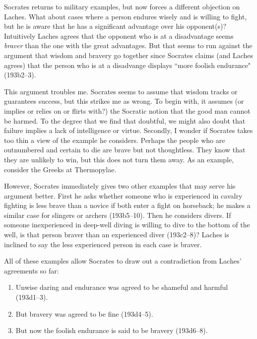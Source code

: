 \documentclass[11pt]{article}
\begin{document}
Socrates returns to military examples, but now forces a different objection on
Laches.  What about cases where a person endures wisely and is willing to
fight, but he is aware that he has a significant advantage over his
opponent(s)?  Intuitively Laches agrees that the opponent who is at
a disadvantage seems \emph{braver} than the one with the great advantages.  But
that seems to run against the argument that wisdom and bravery go together
since Socrates claims (and Laches agrees) that the person who is at
a disadvange displays ``more foolish endurance" (193b2--3).

This argument troubles me.  Socrates seems to assume that wisdom tracks or
guarantees success, but this strikes me as wrong.  To begin with, it assumes
(or implies or relies on or flirts with?) the Socratic notion that the good man
cannot be harmed.  To the degree that we find that doubtful, we might also
doubt that failure implies a lack of intelligence or virtue.  Secondly,
I wonder if Socrates takes too thin a view of the example he considers.
Perhaps the people who are outnumbered and certain to die are brave but not
thoughtless.  They know that they are unlikely to win, but this does not turn
them away.  As an example, consider the Greeks at Thermopylae.

However, Socrates immediately gives two other examples that may serve his
argument better.  First he asks whether someone who is experienced in cavalry
fighting is less brave than a novice if both enter a fight on horseback; he
makes a similar case for slingers or archers (193b5--10).  Then he considers
divers.  If someone inexperienced in deep-well diving is willing to dive to the
bottom of the well, is that person braver than an experienced diver (193c2--8)?
Laches is inclined to say the less experienced person in each case is braver.

All of these examples allow Socrates to draw out a contradiction from Laches'
agreements so far:

\begin{enumerate}

    \item Unwise daring and endurance was agreed to be shameful and harmful
        (193d1--3).

    \item But bravery was agreed to be fine (193d4--5).

    \item But now the foolish endurance is said to be bravery (193d6--8).

\end{enumerate}
\end{document}
